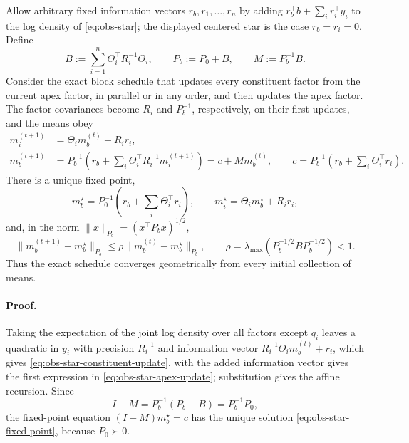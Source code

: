 Allow arbitrary fixed information vectors \(r_b,r_1,\ldots,r_n\) by adding
\(r_b^\top b+\sum_i r_i^\top y_i\) to the log density of \eqref{eq:obs-star}; the displayed centered star is the case \(r_b=r_i=0\). Define
\begin{equation}
B:=\sum_{i=1}^n\Theta_i^\top R_i^{-1}\Theta_i,
\qquad
P_b:=P_0+B,
\qquad
M:=P_b^{-1}B .
\label{eq:obs-star-contraction-data}
\end{equation}
Consider the exact block schedule that updates every constituent factor from the current apex factor, in parallel or in any order, and then updates the apex factor. The factor covariances become \(R_i\) and \(P_b^{-1}\), respectively, on their first updates, and the means obey
\begin{align}
m_i^{(t+1)}
&=\Theta_i m_b^{(t)}+R_ir_i,
\label{eq:obs-star-constituent-update}\\
m_b^{(t+1)}
&=P_b^{-1}\left(r_b+\sum_i\Theta_i^\top R_i^{-1}m_i^{(t+1)}\right)
=c+Mm_b^{(t)},
\qquad
c=P_b^{-1}\left(r_b+\sum_i\Theta_i^\top r_i\right).
\label{eq:obs-star-apex-update}
\end{align}
There is a unique fixed point,
\begin{equation}
m_b^\star
=P_0^{-1}\left(r_b+\sum_i\Theta_i^\top r_i\right),
\qquad
m_i^\star=\Theta_i m_b^\star+R_ir_i ,
\label{eq:obs-star-fixed-point}
\end{equation}
and, in the norm \(\lVert x\rVert_{P_b}=(x^\top P_bx)^{1/2}\),
\begin{equation}
\lVert m_b^{(t+1)}-m_b^\star\rVert_{P_b}
\leq \rho
\lVert m_b^{(t)}-m_b^\star\rVert_{P_b},
\qquad
\rho=\lambda_{\max}\left(P_b^{-1/2}BP_b^{-1/2}\right)<1 .
\label{eq:obs-star-rate}
\end{equation}
Thus the exact schedule converges geometrically from every initial collection of means. 

\paragraph{Proof.}
Taking the expectation of the joint log density over all factors except \(q_i\) leaves a quadratic in \(y_i\) with precision \(R_i^{-1}\) and information vector \(R_i^{-1}\Theta_i m_b^{(t)}+r_i\), which gives \eqref{eq:obs-star-constituent-update}.  with the added information vector gives the first expression in \eqref{eq:obs-star-apex-update}; substitution gives the affine recursion. Since
\[
I-M=P_b^{-1}(P_b-B)=P_b^{-1}P_0,
\]
the fixed-point equation \((I-M)m_b^\star=c\) has the unique solution \eqref{eq:obs-star-fixed-point}, because \(P_0\succ0\).

